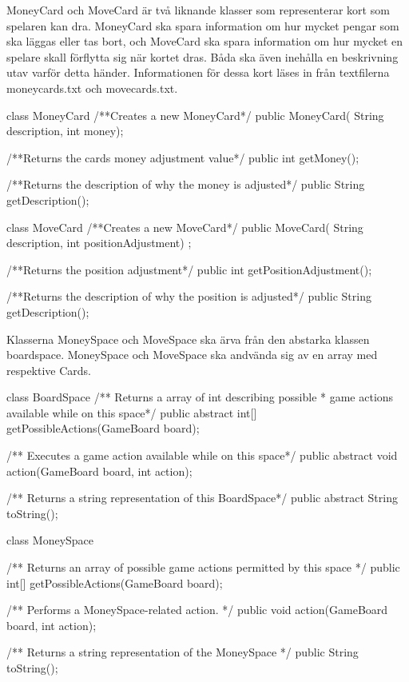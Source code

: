 MoneyCard och MoveCard är två liknande klasser som representerar kort som spelaren kan dra. MoneyCard ska spara information om hur mycket pengar som ska läggas eller tas bort, och MoveCard ska spara information om hur mycket en spelare skall förflytta sig när kortet dras. Båda ska även inehålla en beskrivning utav varför detta händer. Informationen för dessa kort läses in från textfilerna moneycards.txt och movecards.txt.

\begin{JavaSpec}{class MoneyCard}
    /**Creates a new MoneyCard*/
    public MoneyCard( String description, int money);

    /**Returns the cards money adjustment value*/
    public int getMoney();

    /**Returns the description of why the money is adjusted*/ 
    public String getDescription();
\end{JavaSpec}

\begin{JavaSpec}{class MoveCard}
    /**Creates a new MoveCard*/
    public MoveCard( String description, int positionAdjustment) ;

    /**Returns the position adjustment*/
    public int getPositionAdjustment();

    /**Returns the description of why the position is adjusted*/
    public String getDescription();

\end{JavaSpec}

Klasserna MoneySpace och MoveSpace ska ärva från den abstarka klassen boardspace. MoneySpace och MoveSpace ska andvända sig av en array med respektive Cards.

\begin{JavaSpec}{class BoardSpace}
    /** Returns a array of int describing possible
      * game actions available while on this space*/
    public abstract int[] getPossibleActions(GameBoard board);

    /** Executes a game action available while on this space*/
    public abstract void action(GameBoard board, int action);

    /** Returns a string representation of this BoardSpace*/
    public abstract String toString();
\end{JavaSpec}

\begin{JavaSpec}{class MoneySpace}
 
    /** Returns an array of possible game actions permitted by this space */
    public int[] getPossibleActions(GameBoard board);

    /** Performs a MoneySpace-related action. */
    public void action(GameBoard board, int action);

    /** Returns a string representation of the MoneySpace */
   public String toString();

\end{JavaSpec}

